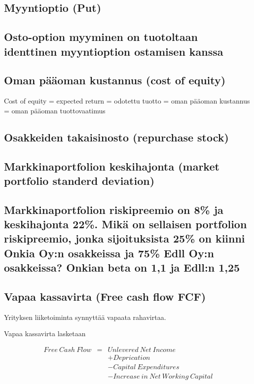 \documentclass[a4paper]{article}
\begin{document}
\subsection{Myyntioptio (Put)}

\subsection{Osto-option myyminen on tuotoltaan identtinen myyntioption ostamisen kanssa}

\subsection{Oman pääoman kustannus (cost of equity)}

Cost of equity = expected return = odotettu tuotto = oman pääoman kustannus = oman pääoman tuottovaatimus

\subsection{Osakkeiden takaisinosto (repurchase stock)}

\subsection{Markkinaportfolion keskihajonta (market portfolio standerd deviation)}



\subsection{Markkinaportfolion riskipreemio on 8\% ja keskihajonta 22\%. Mikä on sellaisen portfolion riskipreemio, jonka sijoituksista 25\% on kiinni Onkia Oy:n osakkeissa ja 75\% Edll Oy:n osakkeissa? Onkian beta on 1,1 ja Edll:n 1,25}

\subsection{Vapaa kassavirta (Free cash flow FCF)}

Yrityksen liiketoiminta synnyttää vapaata rahavirtaa.

Vapaa kassavirta lasketaan

\[
\begin{array}{lcl}
Free\ Cash\ Flow & = & Unlevered\ Net\ Income \\
 & & + Deprication \\
 & & - Capital\ Expenditures \\
 & & - Increase\ in\ Net\ Working\ Capital \\
\end{array}
\]
\end{document}
